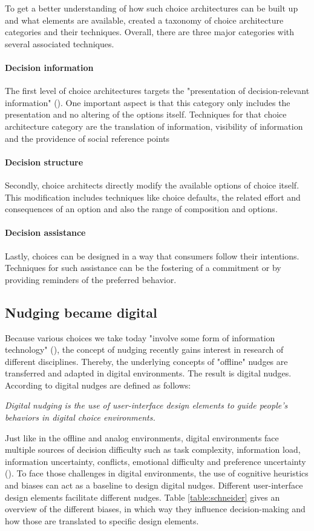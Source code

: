 To get a better understanding of how such choice architectures can be built up and what elements are available,  \cite{munscher_review_2016} created a taxonomy of choice architecture categories and their techniques. Overall, there are three major categories with several associated techniques. 
\paragraph{Decision information}
The first level of choice architectures targets the "presentation of decision-relevant information" (\cite[p.514]{munscher_review_2016}). One important aspect is that this category only includes the presentation and no altering of the options itself. Techniques for that choice architecture category are the translation of information, visibility of information and the providence of social reference points
\paragraph{Decision structure}
Secondly, choice architects directly modify the available options of choice itself. This modification includes techniques like choice defaults, the related effort and consequences of an option and also the range of composition and options.
\paragraph{Decision assistance}
Lastly, choices can be designed in a way that consumers follow their intentions. Techniques for such assistance can be the fostering of a commitment or by providing reminders of the preferred behavior.

\subsection{Nudging became digital}
Because various choices we take today "involve some form of information technology" (\cite[p.490]{johnson_beyond_2012}), the concept of nudging recently gains interest in research of different disciplines. Thereby, the underlying concepts of "offline" nudges are transferred and adapted in digital environments. The result is digital nudges. According to \cite{weinmann_digital_2016} digital nudges are defined as follows:
\begin{center}
\textit{Digital nudging is the use of user-interface design elements to guide people's behaviors in digital choice environments.}
\end{center}
Just like in the offline and analog environments, digital environments face multiple sources of decision difficulty such as task complexity, information load, information uncertainty, conflicts, emotional difficulty and preference uncertainty (\cite{broniarczyk_decision_2014}). To face those challenges in digital environments, the use of cognitive heuristics and biases can act as a baseline to design digital nudges. Different user-interface design elements facilitate different nudges. Table \ref{table:schneider} gives an overview of the different biases, in which way they influence decision-making and how those are translated to specific design elements.

